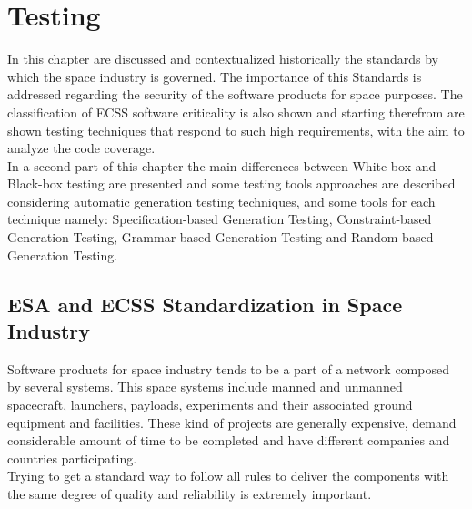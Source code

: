 \cleardoublepage
\chapter{Testing}
\minitoc
{}
In this chapter are discussed and contextualized historically the standards by which the space industry is governed.
The importance of this Standards is addressed regarding the security of the software products for space purposes.
The classification of \ac{ECSS} software criticality is also shown and starting therefrom are shown testing techniques that 
respond to such high requirements, with the aim to analyze the code coverage.\\
In a second part of this chapter the main differences between White-box and Black-box testing are presented and
some testing tools approaches are described considering automatic generation testing techniques, and some tools for each technique namely:
Specification-based Generation Testing, Constraint-based Generation Testing, Grammar-based Generation Testing and
Random-based Generation Testing.
\section{ESA and ECSS Standardization in Space Industry}
Software products for space industry tends to be a part of a network composed by several systems. This space systems include manned and unmanned spacecraft,
launchers, payloads, experiments and their associated ground equipment and facilities\cite{Mattiello-FranciscoSanAmbJogCos:2007:BrSoIn}.
These kind of projects are generally  expensive, demand considerable amount of time to be completed and have different companies and countries participating.\\
Trying to get a standard way to follow all rules to deliver the components with the same degree of quality and reliability is extremely important.\\

